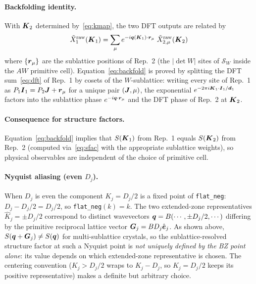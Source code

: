 \documentclass[12pt,a4paper]{article}
\newcommand\bs[1]{\ensuremath\boldsymbol{#1}}
\def\raw{\mathrm{raw}}
\begin{document}
\paragraph{Backfolding identity.}
With $\bs{K}_2$ determined by~\eqref{eq:kmap}, the two DFT outputs are related by
\begin{equation}
    \tilde{X}^{\raw}_1(\bs{K}_1)
    = \sum_{\mu} e^{-i\bs{q}(\bs{K}_1)\cdot \bs{r}_\mu}\;
      \tilde{X}^{\raw}_{2,\mu}(\bs{K}_2)
    \label{eq:backfold}
\end{equation}
where $\{\bs{r}_\mu\}$ are the sublattice positions of Rep.\ 2 (the $|\det W|$ sites of $\mathcal{S}_W$
inside the $AW$ primitive cell). Equation~\eqref{eq:backfold} is proved by splitting the DFT
sum~\eqref{eq:dft} of Rep.\ 1 by cosets of the $W$-sublattice: writing every site of Rep.\ 1 as
$P_1\bs{I}_1 = P_2\bs{J} + \bs{r}_\mu$ for a unique pair $(\bs{J}, \mu)$, the exponential
$e^{-2\pi i \bs{K}_1\cdot \bs{I}_1/\bs{d}_1}$ factors into the sublattice phase $e^{-i\bs{q}\cdot\bs{r}_\mu}$
and the DFT phase of Rep.\ 2 at $\bs{K}_2$.

\paragraph{Consequence for structure factors.}
Equation~\eqref{eq:backfold} implies that $S(\bs{K}_1)$ from Rep.\ 1
equals $S(\bs{K}_2)$ from Rep.\ 2 (computed via~\eqref{eq:sfac} with the appropriate sublattice weights),
so physical observables are independent of the choice of primitive cell.

\paragraph{Nyquist aliasing (even $D_j$).}
When $D_j$ is even the component $K_j = D_j/2$ is a fixed point of
\texttt{flat\_neg}: $D_j - D_j/2 = D_j/2$, so \texttt{flat\_neg}$(k)=k$.
The two extended-zone representatives $\hat{K}_j = \pm D_j/2$
correspond to distinct wavevectors $\bs{q} = B(\cdots,\pm D_j/2,\cdots)$
differing by the primitive reciprocal lattice vector $\bs{G}_j = B D_j \hat{\bs{e}}_j$.
As shown above, $S(\bs{q}+\bs{G}_j)\neq S(\bs{q})$ for multi-sublattice
crystals, so the sublattice-resolved structure factor at such a Nyquist point
is \emph{not uniquely defined by the BZ point alone}: its value depends on
which extended-zone representative is chosen.  The centering convention
($K_j > D_j/2$ wraps to $K_j - D_j$, so $K_j = D_j/2$ keeps its positive
representative) makes a definite but arbitrary choice.
\end{document}
